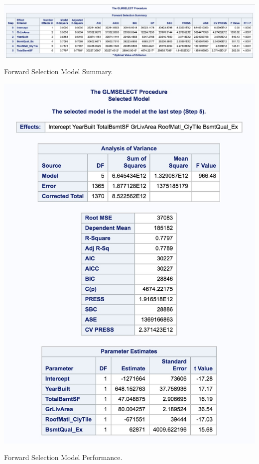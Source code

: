 \documentclass[11pt]{scrartcl} %
\begin{document}
\hrulefill
\begin{table}[H] %
	\centering %
	\includegraphics[scale=.25]{../graphics/A2FWfeatures}
	\caption{Forward Selection Model Summary.}
	\label{tab:A2FWsummary}
\end{table}
\hrulefill
\begin{table}[H] %
	\centering %
	\includegraphics[scale=.3]{../graphics/A2FWresults}
	\caption{Forward Selection Model Performance.}
	\label{tab:A2FWperf}
\end{table}
\end{document}
